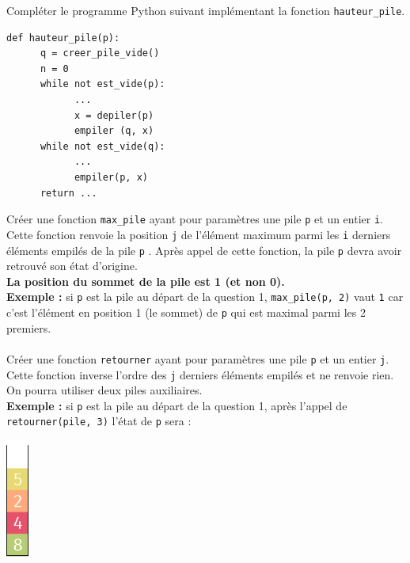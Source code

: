 \documentclass[a4paper,12pt,eval,firamath]{nsi}
\begin{document}
\question Compléter le programme Python suivant implémentant la fonction \texttt{hauteur_pile}.

\begin{pyc}
      \begin{verbatim}
def hauteur_pile(p):
      q = creer_pile_vide()
      n = 0
      while not est_vide(p):
            ...
            x = depiler(p)
            empiler (q, x)
      while not est_vide(q):
            ...
            empiler(p, x)
      return ...                        
      \end{verbatim}
\end{pyc}

\question  Créer une fonction \texttt{max_pile} ayant pour paramètres une pile \texttt{p}  et un entier \texttt{i}.\\
Cette fonction renvoie la position \texttt{j}  de l'élément maximum parmi les \texttt{i} derniers éléments empilés de la pile \texttt{p} .
Après appel de cette fonction, la pile \texttt{p}  devra avoir retrouvé son état d'origine.\\
\textbf{La position du sommet de la pile est 1 (et non 0).}\\
\textbf{Exemple :} si \texttt{p}  est la pile au départ de la question 1, \texttt{max_pile(p, 2)} vaut \texttt{1}  car c'est l'élément en position 1 (le sommet) de \texttt{p} qui est maximal parmi les 2 premiers.\\

\\


\question Créer une fonction \texttt{retourner}  ayant pour paramètres une pile \texttt{p}  et un entier \texttt{j}. Cette fonction inverse l'ordre des \texttt{j} derniers éléments empilés et ne renvoie rien. On pourra utiliser deux piles auxiliaires.\\
\textbf{Exemple :} si \texttt{p}  est la pile au départ de la question 1, après l'appel de \texttt{retourner(pile, 3)} l'état de \texttt{p} sera :
\begin{center}
      \includegraphics[width=0.75cm]{img/pile2.png}
\end{center}
\\
\end{document}
